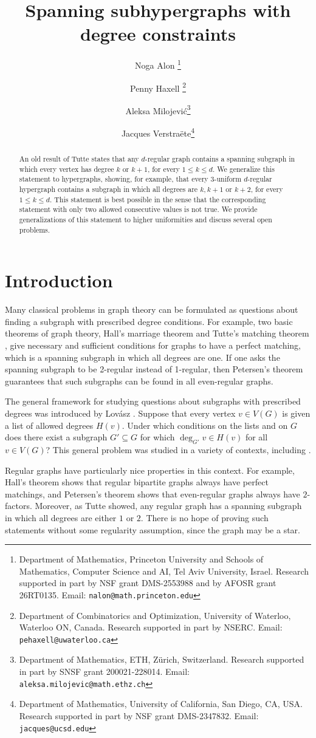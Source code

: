 \documentclass[11pt, a4paper]{article}
\title{Spanning subhypergraphs with degree constraints}
\date{}
\author{Noga Alon \thanks{Department of Mathematics, Princeton University and Schools of Mathematics, Computer Science and AI, Tel Aviv University, Israel. Research supported in part by NSF grant DMS-2553988 and by AFOSR grant 26RT0135. {Email}: {\tt nalon@math.princeton.edu}}
\and Penny Haxell \thanks{Department of Combinatorics and Optimization, University of Waterloo, Waterloo ON, Canada. Research supported in part by NSERC. {Email:} {\tt pehaxell@uwaterloo.ca}}
\and Aleksa Milojevi\'c\thanks{Department of Mathematics, ETH, Z\"urich, Switzerland. Research supported in part by SNSF grant 200021-228014. {Email}: {\tt aleksa.milojevic@math.ethz.ch}} \and
Jacques Verstra\"ete\thanks{Department of Mathematics, University of California, San Diego, CA, USA. Research supported in part by NSF grant DMS-2347832. {Email:} {\tt jacques@ucsd.edu}}}
\numberwithin{theorem}{section} %
\theoremstyle{remark}
\theoremstyle{definition}
\begin{document}
\maketitle

\begin{abstract}
An old result of Tutte states that any $d$-regular graph contains a spanning subgraph in which every vertex has degree $k$ or $k+1$, for every $1\leq k\leq d$. We generalize this statement to hypergraphs, showing, for example, that every $3$-uniform $d$-regular hypergraph contains a subgraph in which all degrees are $k, k+1$ or $k+2$, for every $1\leq k\leq d$. This statement is best possible in the sense that the corresponding statement with only two allowed consecutive values is not true. We provide generalizations of this statement to higher uniformities and discuss several open problems. 
\end{abstract}

\section{Introduction}

Many classical problems in graph theory can be formulated as questions about finding a subgraph with prescribed degree conditions. For example, two basic theorems of graph theory, Hall's marriage theorem \cite{Hall35} and Tutte's matching theorem \cite{Tutte47}, give necessary and sufficient conditions for graphs to have a perfect matching, which is a spanning subgraph in which all degrees are one. If one asks the spanning subgraph to be 2-regular instead of 1-regular, then Petersen's theorem \cite{Petersen91} guarantees that such subgraphs can be found in all even-regular graphs.

The general framework for studying questions about subgraphs with prescribed degrees was introduced by Lov\'asz \cite{Lovasz70Valencies,Lovasz72}. Suppose that every vertex $v\in V(G)$ is given a list of allowed degrees $H(v)$. Under which conditions on the lists and on $G$ does there exist a subgraph $G'\subseteq G$ for which $\deg_{G'} v\in H(v)$ for all $v\in V(G)$? This general problem was studied in a variety of contexts, including \cite{AddarioBerryDalalReed08, BergeLasVergnas, Cornuejols88, ShiraziVerstraete08}.

Regular graphs have particularly nice properties in this context. For example, Hall's theorem shows that regular bipartite graphs always have perfect matchings, and Petersen's theorem shows that even-regular graphs always have $2$-factors. Moreover, as Tutte \cite{Tutte53} showed, any regular graph has a spanning subgraph in which all degrees are either $1$ or $2$. There is no hope of proving such statements without some regularity assumption, since the graph may be a star.
\end{document}
